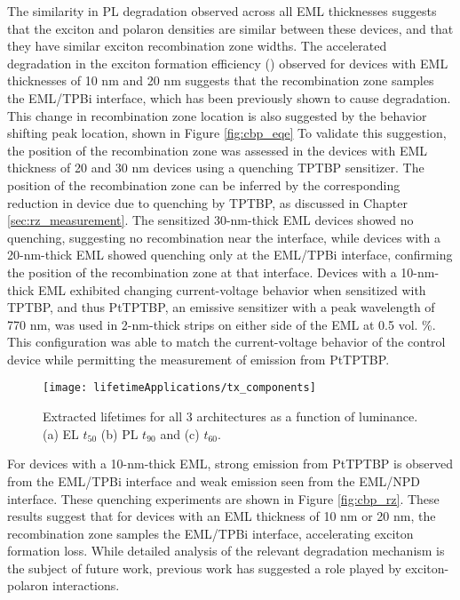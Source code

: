 \documentclass[../thesis.tex]{subfiles}
\begin{document}
The similarity in PL degradation observed across all EML thicknesses suggests that the exciton and polaron densities are similar between these devices,\supercite{Giebink2008a,Coburn2017,Lee2017} and that they have similar exciton recombination zone widths.  
The accelerated degradation in the exciton formation efficiency (\ef) observed for devices with EML thicknesses of 10 nm and 20 nm suggests that the recombination zone samples the EML/TPBi interface, which has been previously shown to cause degradation.\supercite{Wang2013,Wang2014}
This change in recombination zone location is also suggested by the \eqe behavior shifting peak location, shown in Figure \ref{fig:cbp_eqe}
To validate this suggestion, the position of the recombination zone was assessed in the devices with EML thickness of 20 and 30 nm devices using a quenching TPTBP sensitizer.  
The position of the recombination zone can be inferred by the corresponding reduction in device \eqe due to quenching by TPTBP,\supercite{Erickson2013a} as discussed in Chapter \ref{sec:rz_measurement}.
The sensitized 30-nm-thick EML devices showed no quenching, suggesting no recombination near the interface, while devices with a 20-nm-thick EML showed quenching only at the EML/TPBi interface, confirming the position of the recombination zone at that interface.  
Devices with a 10-nm-thick EML exhibited changing current-voltage behavior when sensitized with TPTBP, and thus PtTPTBP, an emissive sensitizer with a peak wavelength of 770 nm, was used in 2-nm-thick strips on either side of the EML at 0.5 vol. \%.
This configuration was able to match the current-voltage behavior of the control device while permitting the measurement of emission from PtTPTBP.  
\begin{wrapfigure}{r}{.5\textwidth}
\centering
\texttt{[image: lifetimeApplications/tx\_components]}
\caption{Extracted lifetimes for all 3 architectures as a function of luminance. (a) EL $t_{50}$ (b) PL $t_{90}$ and (c) \ef $t_{60}$.}
\label{fig:tx_components}
\end{wrapfigure}
For devices with a 10-nm-thick EML, strong emission from PtTPTBP is observed from the EML/TPBi interface and weak emission seen from the EML/NPD interface. 
These quenching experiments are shown in Figure \ref{fig:cbp_rz}.
These results suggest that for devices with an EML thickness of 10 nm or 20 nm, the recombination zone samples the EML/TPBi interface, accelerating exciton formation loss.  
While detailed analysis of the relevant degradation mechanism is the subject of future work, previous work has suggested a role played by exciton-polaron interactions.\supercite{Wang2015a,Zhang2016,Giebink2008a,Kondakov2007d,Kondakov2003}
\end{document}
